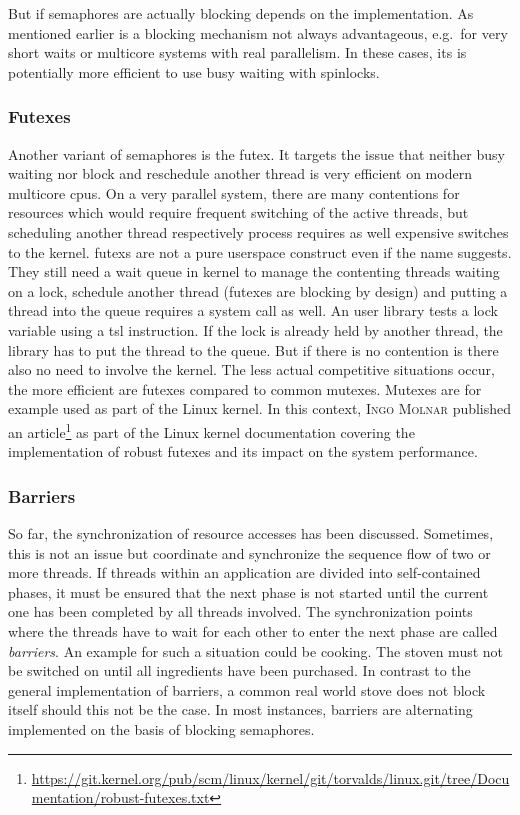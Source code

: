 But if semaphores are actually blocking depends on the implementation.
As mentioned earlier is a blocking mechanism not always advantageous, e.g.\ for very short waits or multicore systems with real parallelism.
In these cases, its is potentially more efficient to use busy waiting with spinlocks\cite{glatz2015betriebssysteme}.

\subsubsection*{Futexes}
Another variant of semaphores is the \ac{futex}. 
It targets the issue that neither busy waiting nor block and reschedule another thread is very efficient on modern multicore \acp{cpu}.
On a very parallel system, there are many contentions for resources which would require frequent switching of the active threads, but scheduling another thread respectively process requires as well expensive switches to the kernel\cite{tanenbaum-modern-operating-systems}.
\acp{futex} are not a pure userspace construct even if the name suggests. 
They still need a wait queue in kernel to manage the contenting threads waiting on a lock, schedule another thread (futexes are blocking by design) and putting a thread into the queue requires a system call as well.
An user library tests a lock variable using a \ac{tsl} instruction.
If the lock is already held by another thread, the library has to put the thread to the queue.
But if there is no contention is there also no need to involve the kernel\cite{tanenbaum-modern-operating-systems}.
The less actual competitive situations occur, the more efficient are futexes compared to common mutexes.
Mutexes are for example used as part of the Linux kernel. 
In this context, \textsc{Ingo Molnar} published an article\footnote{\url{https://git.kernel.org/pub/scm/linux/kernel/git/torvalds/linux.git/tree/Documentation/robust-futexes.txt}} as part of the Linux kernel documentation covering the implementation of robust futexes and its impact on the system performance.

\subsubsection*{Barriers}
So far, the synchronization of resource accesses has been discussed.
Sometimes, this is not an issue but coordinate and synchronize the sequence flow of two or more threads.
If threads within an application are divided into self-contained phases, it must be ensured that the next phase is not started until the current one has been completed by all threads involved\cite{tanenbaum-modern-operating-systems}.
The synchronization points where the threads have to wait for each other to enter the next phase are called \textit{barriers}.
An example for such a situation could be cooking.
The stoven must not be switched on until all ingredients have been purchased.
In contrast to the general implementation of barriers, a common real world stove does not block itself should this not be the case.
In most instances, barriers are alternating implemented on the basis of blocking semaphores\cite{glatz2015betriebssysteme}.



